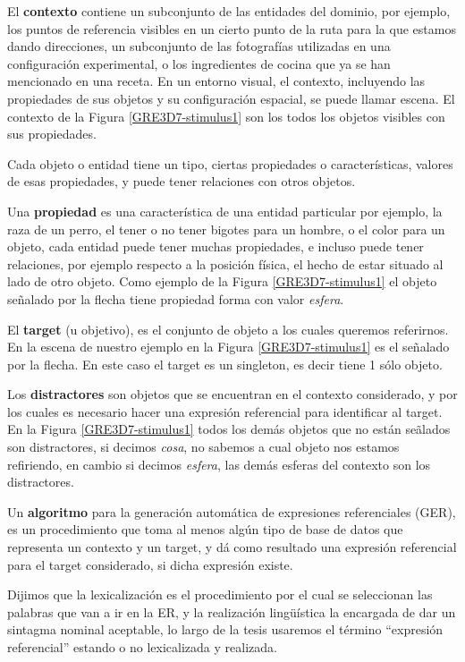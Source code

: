 El {\bf contexto} contiene un subconjunto de las entidades del dominio, por ejemplo, los puntos de referencia visibles en un cierto punto de la ruta para la que estamos dando direcciones, un subconjunto de las fotograf\'ias utilizadas en una configuraci\'on experimental, o los ingredientes de cocina que ya se han mencionado en una receta. En un entorno visual, el contexto, incluyendo las propiedades de sus objetos y su configuraci\'on espacial, se puede llamar escena. El contexto de la Figura \ref{GRE3D7-stimulus1} son los todos los objetos visibles con sus propiedades.

Cada objeto o entidad tiene un tipo, ciertas propiedades o caracter\'isticas, valores de esas propiedades, y puede tener relaciones con otros objetos.

Una {\bf propiedad} es una caracter\'istica de una entidad particular por ejemplo, la raza de un perro, el tener o no tener bigotes para un hombre, o el color para un objeto, cada entidad puede tener muchas propiedades, e incluso puede tener relaciones, por ejemplo respecto a la posici\'on f\'isica, el hecho de estar situado al lado de otro objeto. Como ejemplo de la Figura \ref{GRE3D7-stimulus1} el objeto se\~nalado por la flecha tiene propiedad forma con valor {\it esfera}.

El {\bf target} (u objetivo), es el conjunto de objeto a los cuales queremos referirnos. En la escena de nuestro ejemplo en la Figura \ref{GRE3D7-stimulus1} es el se\~nalado por la flecha. En este caso el target es un singleton, es decir tiene 1 s\'olo objeto.

Los {\bf distractores} son objetos que se encuentran en el contexto considerado, y por los cuales es necesario hacer una expresi\'on referencial para identificar al target. En la Figura \ref{GRE3D7-stimulus1} todos los dem\'as objetos que no est\'an se\~alados son distractores, si decimos {\it cosa}, no sabemos a cual objeto nos estamos refiriendo, en cambio si decimos {\it esfera}, las dem\'as esferas del contexto son los distractores.

Un {\bf algoritmo} para la generaci\'on autom\'atica de expresiones referenciales (GER), es un procedimiento que toma al menos alg\'un tipo de base de datos que representa un contexto y un target, y d\'a como resultado una expresi\'on referencial para el target considerado, si dicha expresi\'on existe.

Dijimos que la lexicalizaci\'on es el procedimiento por el cual se seleccionan las palabras que van a ir en la ER, y la realizaci\'on ling\"u\'istica la encargada de dar un sintagma nominal aceptable, lo largo de la tesis usaremos el t\'ermino ``expresi\'on referencial'' estando o no lexicalizada y realizada.

